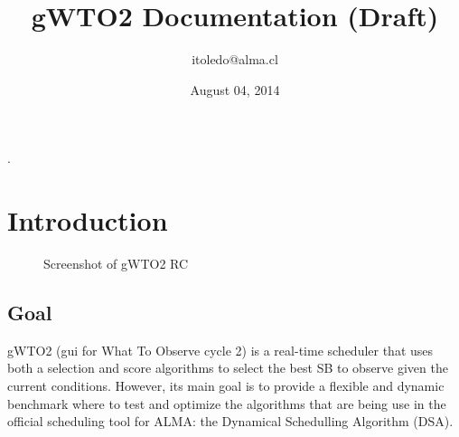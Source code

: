\documentclass[a4paper,10pt,english]{sphinxmanual}
\title{gWTO2 Documentation (Draft)}
\date{August 04, 2014}
\author{itoledo@alma.cl}
\begin{document}
\maketitle
\tableofcontents
{}\label{index::doc}


.


\chapter{Introduction}
\label{intro2:introduction}\label{intro2:gwto2-documentation-contents}\label{intro2::doc}\begin{figure}[htbp]
\centering
\capstart

\caption{Screenshot of gWTO2 RC}\end{figure}


\section{Goal}
\label{intro2:goal}
gWTO2 (gui for What To Observe cycle 2) is a real-time scheduler that uses both
a selection and score algorithms to select the best SB to observe given the
current conditions. However, its main goal is to provide a flexible and dynamic
benchmark where to test and optimize the algorithms that are being use in the
official scheduling tool for ALMA: the Dynamical Schedulling Algorithm (DSA).
\end{document}
